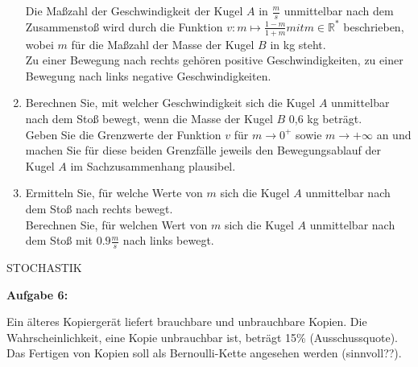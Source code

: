 \documentclass[a4paper,12pt]{article}
\newcommand{\Aufgabe}[1]{
  {
  \vspace*{0.5cm}
  \textsf{\textbf{Aufgabe #1}}
  \vspace*{0.2cm}
  
  }
}
\begin{document}
\begin{enumerate}[label={\alph*)}]

    Die Maßzahl der Geschwindigkeit der Kugel $A$ in $\frac{m}{s}$ unmittelbar nach dem Zusammenstoß wird durch die Funktion $v: m\mapsto \frac{1-m}{1+m} mit m \in \mathbb{R}^*$ beschrieben, wobei $m$ für die Maßzahl der Masse der Kugel $B$ in kg steht.\\
Zu einer Bewegung nach rechts gehören positive Geschwindigkeiten, zu einer Bewegung nach links negative Geschwindigkeiten.

\item Berechnen Sie, mit welcher Geschwindigkeit sich die Kugel $A$ unmittelbar nach dem Stoß bewegt, wenn die Masse der Kugel $B$ 0,6 kg beträgt.\\
  Geben Sie die Grenzwerte der Funktion $v$ für $m \rightarrow 0^+$ sowie $m \rightarrow +\infty$ an und machen Sie für diese beiden Grenzfälle jeweils den Bewegungsablauf der Kugel $A$ im Sachzusammenhang plausibel.

\item Ermitteln Sie, für welche Werte von $m$ sich die Kugel $A$ unmittelbar nach dem Stoß nach rechts bewegt.\\
  Berechnen Sie, für welchen Wert von $m$ sich die Kugel $A$ unmittelbar nach dem Stoß mit $\num{0,9} \frac{m}{s}$ nach links bewegt.
\end{enumerate}

\newpage
\addtolength{\voffset}{-2cm}

STOCHASTIK

\Aufgabe{6:} 

Ein älteres Kopiergerät liefert brauchbare und unbrauchbare Kopien. Die Wahrscheinlichkeit, eine Kopie unbrauchbar ist, beträgt 15\% (Ausschussquote). Das Fertigen von Kopien soll als Bernoulli-Kette angesehen werden (sinnvoll??).
\end{document}
